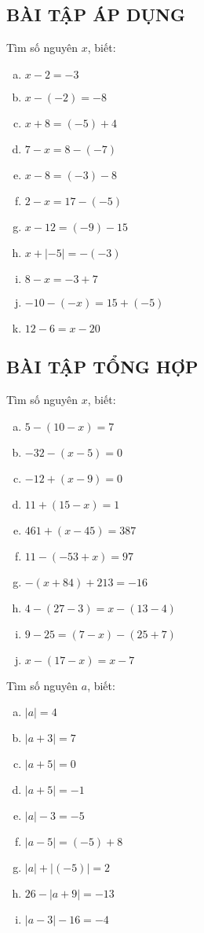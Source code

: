 \subsection{BÀI TẬP ÁP DỤNG}
\begin{bt}
Tìm số nguyên $x$, biết:
\begin{multicols}{2}
\begin{enumerate}[a)]
\item	$x-2=-3$
\item $x - (-2)=-8$
\item $x+8 = (-5)+4$
\item $7-x = 8 -(-7)$
\item $x-8 = (-3) - 8$
\item $2-x=17 - (-5)$
\item $x-12=(-9)-15$
\item $x+|-5| = -(-3)$
\item $8-x = -3+7$
\item $-10-(-x) = 15+(-5)$
\item $12-6=x-20$
\end{enumerate}
\end{multicols}
\subsection{BÀI TẬP TỔNG HỢP}
\end{bt}   \begin{bt}
Tìm số nguyên $x$, biết:
\begin{multicols}{2}
\begin{enumerate}[a)]
\item $5-(10-x)=7$
\item $-32-(x-5)=0$
\item $-12+ (x-9) =0$
\item $11 + (15-x)=1$
\item $461 + (x-45) = 387$
\item $11 - (-53+x)=97$
\item $-(x+84) + 213 = -16$
\item $4-(27-3)=x-(13-4)$
\item $9-25 = (7-x)-(25+7)$
\item $x-(17-x)=x-7$
\end{enumerate}
\end{multicols}

\end{bt}   \begin{bt}
Tìm số nguyên $a$, biết:
\begin{multicols}{2}
\begin{enumerate}[a)]
\item $|a|=4$
\item $|a+3|=7$
\item $|a+5|=0$
\item $|a+5|=-1$
\item $|a|-3 = -5$
\item $|a-5| = (-5) + 8$
\item $|a| + |(-5)| =2$
\item $26 - |a+9| = -13$
\item $|a-3| - 16= -4$
\end{enumerate}
\end{multicols}
\end{bt}